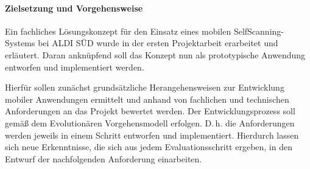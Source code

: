 \paragraph*{Zielsetzung und Vorgehensweise}
Ein fachliches Lösungskonzept für den Einsatz eines mobilen SelfScanning-Systems bei ALDI SÜD wurde in der ersten Projektarbeit  erarbeitet und erläutert. Daran anknüpfend soll das Konzept nun als prototypische Anwendung entworfen und implementiert werden. %


Hierfür sollen zunächst grundsätzliche Herangehensweisen zur Entwicklung mobiler Anwendungen ermittelt und anhand von fachlichen und technischen Anforderungen an das Projekt bewertet werden. Der Entwicklungsprozess soll gemäß dem Evolutionären Vorgehensmodell erfolgen. D.\,h. die Anforderungen werden jeweils in einem Schritt entworfen und implementiert. Hierdurch lassen sich neue Erkenntnisse, die sich aus jedem Evaluationsschritt ergeben, in den Entwurf der nachfolgenden Anforderung einarbeiten.


